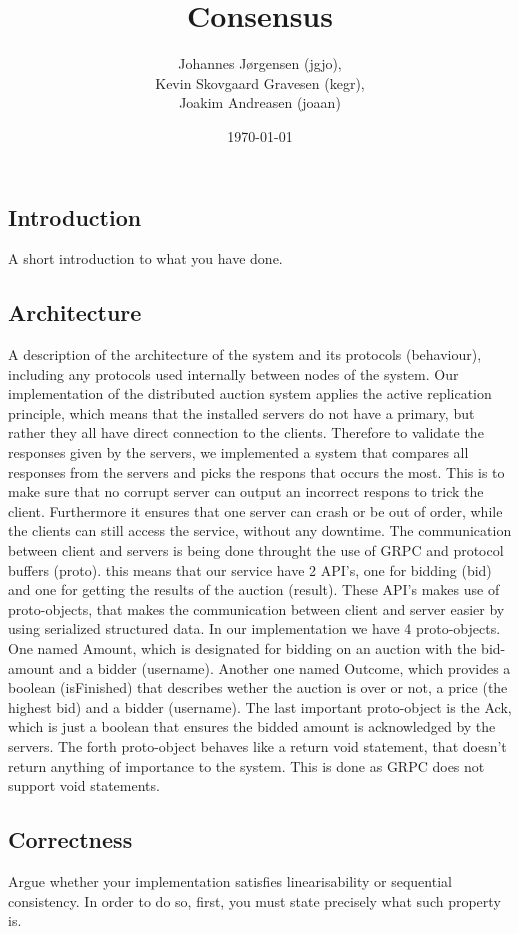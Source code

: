 \documentclass[a4paper,11pt]{article}
\title{Consensus}
\author{Johannes Jørgensen (jgjo),\\ Kevin Skovgaard Gravesen (kegr),\\ Joakim Andreasen (joaan)}
\date{\today}
\begin{document}
 

\maketitle

\subsection{Introduction}
A short introduction to what you have done.
\subsection{Architecture}
A description of the architecture of the system and its protocols (behaviour), including any protocols used internally between nodes of the system. 
Our implementation of the distributed auction system applies the active replication principle, which means that the installed servers do not have a primary, but rather they all have direct connection to the clients. 
Therefore to validate the responses given by the servers, we implemented a system that compares all responses from the servers and picks the respons that occurs the most. This is to make sure that no corrupt server can output an incorrect respons to trick the client.
Furthermore it ensures that one server can crash or be out of order, while the clients can still access the service, without any downtime. The communication between client and servers is being done throught the use of GRPC and protocol buffers (proto). 
this means that our service have 2 API's, one for bidding (bid) and one for getting the results of the auction (result). These API's makes use of proto-objects, that makes the communication between client and server easier by using serialized structured data.
In our implementation we have 4 proto-objects. One named Amount, which is designated for bidding on an auction with the bid-amount and a bidder (username). Another one named Outcome, which provides a boolean (isFinished) that describes wether the auction is over or not, a price (the highest bid) and a bidder (username). The last important proto-object is the Ack, which is just a boolean that ensures the bidded amount is acknowledged by the servers. The forth proto-object behaves like a return void statement, that doesn't return anything of importance to the system. This is done as GRPC does not support void statements.
\subsection{Correctness}
Argue whether your implementation satisfies linearisability or sequential consistency. In order to do so, first, you must state precisely what such property is. 
\end{document}
